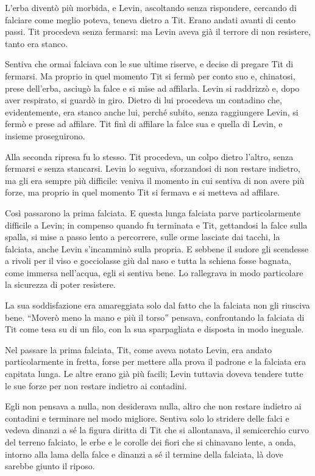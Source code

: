 L'erba diventò più morbida, e Levin, ascoltando senza rispondere, cercando di falciare come meglio poteva, teneva dietro a Tit. Erano andati avanti di cento passi. Tit procedeva senza fermarsi: ma Levin aveva già il terrore di non resistere, tanto era stanco. 

Sentiva che ormai falciava con le sue ultime riserve, e decise di pregare Tit di fermarsi. Ma proprio in quel momento Tit si fermò per conto suo e, chinatosi, prese dell'erba, asciugò la falce e si mise ad affilarla. Levin si raddrizzò e, dopo aver respirato, si guardò in giro. Dietro di lui procedeva un contadino che, evidentemente, era stanco anche lui, perché subito, senza raggiungere Levin, si fermò e prese ad affilare. Tit finì di affilare la falce sua e quella di Levin, e insieme proseguirono. 

Alla seconda ripresa fu lo stesso. Tit procedeva, un colpo dietro l'altro, senza fermarsi e senza stancarsi. Levin lo seguiva, sforzandosi di non restare indietro, ma gli era sempre più difficile: veniva il momento in cui sentiva di non avere più forze, ma proprio in quel momento Tit si fermava e si metteva ad affilare. 

Così passarono la prima falciata. E questa lunga falciata parve particolarmente difficile a Levin; in compenso quando fu terminata e Tit, gettandosi la falce sulla spalla, si mise a passo lento a percorrere, sulle orme lasciate dai tacchi, la falciata, anche Levin s'incamminò sulla propria. E sebbene il sudore gli scendesse a rivoli per il viso e gocciolasse giù dal naso e tutta la schiena fosse bagnata, come immersa nell'acqua, egli si sentiva bene. Lo rallegrava in modo particolare la sicurezza di poter resistere. 

La sua soddisfazione era amareggiata solo dal fatto che la falciata non gli riusciva bene. ``Moverò meno la mano e più il torso'' pensava, confrontando la falciata di Tit come tesa su di un filo, con la sua sparpagliata e disposta in modo ineguale. 

Nel passare la prima falciata, Tit, come aveva notato Levin, era andato particolarmente in fretta, forse per mettere alla prova il padrone e la falciata era capitata lunga. Le altre erano già più facili; Levin tuttavia doveva tendere tutte le sue forze per non restare indietro ai contadini. 

Egli non pensava a nulla, non desiderava nulla, altro che non restare indietro ai contadini e terminare nel modo migliore. Sentiva solo lo stridere delle falci e vedeva dinanzi a sé la figura diritta di Tit che si allontanava, il semicerchio curvo del terreno falciato, le erbe e le corolle dei fiori che si chinavano lente, a onda, intorno alla lama della falce e dinanzi a sé il termine della falciata, là dove sarebbe giunto il riposo. 


